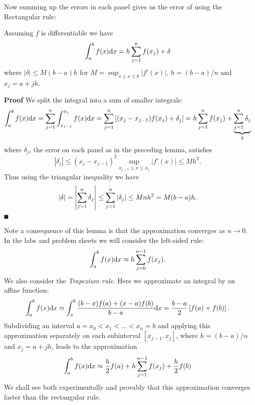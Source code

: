 Now summing up the errors in each panel gives us the error of using the Rectangular rule:

\begin{theorem} Assuming $f$ is differentiable we have
\[
\ensuremath{\int}_a^b f(x) {\rm d}x =  h \ensuremath{\sum}_{j=1}^n f(x_j) +  \ensuremath{\delta}
\]
where $|\ensuremath{\delta}| \ensuremath{\leq} M (b-a) h$ for $M = \sup_{a \ensuremath{\leq} x \ensuremath{\leq} b}|f'(x)|$, $h = (b-a)/n$ and $x_j = a + jh$.

\end{theorem}
\textbf{Proof} We split the integral into a sum of smaller integrals:
\[
\ensuremath{\int}_a^b f(x) {\rm d}x = \ensuremath{\sum}_{j=1}^n  \ensuremath{\int}_{x_{j-1}}^{x_j} f(x) {\rm d}x =
\ensuremath{\sum}_{j=1}^n  \br[(x_j - x_{j-1}) f(x_j) + \ensuremath{\delta}_j] =  h \ensuremath{\sum}_{j=1}^n f(x_j) +  \underbrace{\ensuremath{\sum}_{j=1}^n \ensuremath{\delta}_j}_\ensuremath{\delta}
\]
where $\ensuremath{\delta}_j$, the error on each panel as in the preceding lemma, satisfies
\[
|\ensuremath{\delta}_j| \ensuremath{\leq} (x_j-x_{j-1})^2 \sup_{x_{j-1} \ensuremath{\leq} x \ensuremath{\leq} x_j}|f'(x)| \ensuremath{\leq} M h^2.
\]
Thus using the triangular inequality we have
\[
|\delta| = \left|{ \sum_{j=1}^n \delta_j}\right| \leq \sum_{j=1}^n |\delta_j| \leq M n h^2 = M(b-a)h.
\]
\ensuremath{\QED}

Note a consequence of this lemma is that the approximation converges as $n \ensuremath{\rightarrow} 0$. In the labs and problem sheets we will consider the left-sided rule:
\[
\ensuremath{\int}_a^b f(x) {\rm d}x \ensuremath{\approx}  h \ensuremath{\sum}_{j=0}^{n-1} f(x_j).
\]
We also consider the \emph{Trapezium rule}. Here we approximate an integral  by an affine function:
\[
\ensuremath{\int}_a^b f(x) {\rm d} x \ensuremath{\approx} \ensuremath{\int}_a^b {(b-x)f(a) + (x-a)f(b) \over b-a} \dx
= {b-a \over 2} \br[f(a) + f(b)].
\]
Subdividing an interval $a = x_0 < x_1 < \ensuremath{\ldots} < x_n = b$ and applying this approximation separately on each subinterval $[x_{j-1},x_j]$, where $h = (b-a)/n$ and $x_j = a + jh$, leads to the approximation
\[
\ensuremath{\int}_a^b f(x) {\rm d}x \ensuremath{\approx}  {h \over 2} f(a) + h \ensuremath{\sum}_{j=1}^{n-1} f(x_j) + {h \over 2} f(b)
\]
We shall see both experimentally and provably that this approximation converges faster than the rectangular rule.



